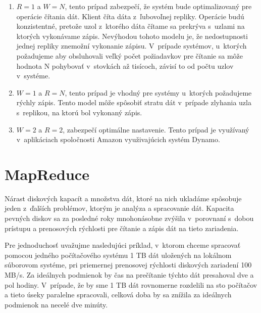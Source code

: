 \documentclass[11pt,twoside,a4paper]{book}
\begin{document}
\begin{enumerate}
 \item $R = 1$ a $W = N$, tento prípad zabezpečí, že systém bude optimalizovaný pre operácie čítania dát. Klient číta dáta z~ľubovoľnej repliky. Operácie budú konzistentné, pretože uzol z~ktorého dáta čítame sa prekrýva s~uzlami na ktorých vykonávame zápis. Nevýhodou tohoto modelu je, že nedostupnosti jednej repliky znemožní vykonanie zápisu. V~prípade systémov, u~ktorých požadujeme aby obsluhovali veľký počet požiadavkov pre čítanie sa môže hodnota N pohybovať v~stovkách až tisícoch, závisí to od počtu uzlov v~systéme.
 \item $W = 1$ a $R = N$, tento prípad je vhodný pre systémy u~ktorých požadujeme rýchly zápis. Tento model môže spôsobiť stratu dát v~prípade zlyhania uzla s~replikou, na ktorú bol vykonaný zápis.
 \item $W = 2$ a $R = 2$, zabezpečí optimálne nastavenie. Tento prípad je využívaný v~aplikáciach spoločnosti Amazon využivajúcich systém Dynamo.
\end{enumerate}


\section{MapReduce}

Nárast diskových kapacít a množstva dát, ktoré na nich ukladáme spôsobuje jeden z~ďalších problémov, ktorým je analýza a spracovanie dát. Kapacita pevných diskov sa za posledné roky mnohonásobne zvýšila v~porovnaní s~dobou prístupu a prenosových rýchlosti pre čítanie a zápis dát na tieto zariadenia.

Pre jednoduchosť uvažujme nasledujúci príklad, v~ktorom chceme spracovať pomocou jedného počítačového systému 1 TB dát uložených na lokálnom súborovom systéme, pri priemernej prenosovej rýchlosti diskových zariadení 100 MB/s. Za ideálnych podmienok by čas na prečítanie týchto dát presahoval dve a pol hodiny. V~prípade, že by sme 1 TB dát rovnomerne rozdelili na sto počítačov a tieto úseky paralelne spracovali, celková doba by sa znížila za ideálnych podmienok na necelé dve minúty. 
\end{document}
